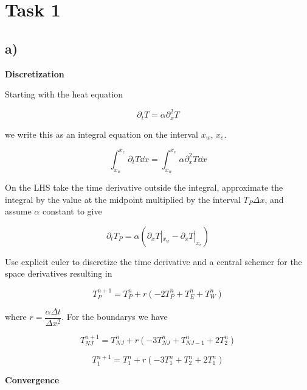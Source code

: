 \documentclass{article}
\begin{document}
\section{Task 1}

\subsection*{a)}

\textbf{Discretization}

Starting with the heat equation

\begin{equation}
	\partial_t T = \alpha \partial_x^2 T
\end{equation}

we write this as an integral equation on the interval $x_w$, $x_e$.

\begin{equation}
	\int_{x_w}^{x_e}  \partial_t T \dd{x} = \int_{x_w}^{x_e}  \alpha \partial_x^2 T \dd{x}
\end{equation}

On the LHS take the time derivative outside the integral, approximate the integral by the value at the midpoint multiplied by the interval $T_P \Delta x$, and assume $\alpha$ constant to give

\begin{equation}
 	\partial_t T_P = \alpha (\partial_x T |_{x_w} - \partial_x T |_{x_e})
\end{equation}

Use explicit euler to discretize the time derivative and a central schemer for the space derivatives resulting in

\begin{equation}
 	T_P^{n+1} = T_P^n + r ( -2T_P^n + T_E^n + T_W^n)
\end{equation}

where $r = \dfrac{\alpha \Delta t }{\Delta x^2} $. For the boundarys we have 

\begin{equation}
 	T_{NJ}^{n+1} = T_{NJ}^n + r ( -3T_{NJ}^n + T_{NJ-1}^n + 2T_2^n)
\end{equation}

\begin{equation}
 	T_{1}^{n+1} = T_1^n + r ( -3T_{1}^n + T_{2}^n + 2T_1^n)
\end{equation}




\textbf{Convergence}
\end{document}
